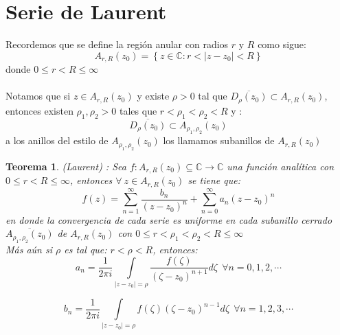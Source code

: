 \documentclass[spanish, openright,oneside]{book}
\newtheorem{teo}{Teorema}[chapter]
\theoremstyle{definition}
\begin{document}
\section*{Serie de Laurent \ \textbf{\textsf{\cite{marsd1996}}}  }
Recordemos que se define la región anular con radios $r$ y $R$ como sigue:
\[
A_{r,R}(z_0)=\left\{ z\in\mathbb{C} : r<|z-z_0|<R\right\}
\]
donde $0\leq r < R \leq \infty$\\
\\
Notamos que si $z \in A_{r,R}(z_0)$ y existe $\rho >0$ tal que $\overline{D_\rho(z_0)} \subset A_{r,R}(z_0) $, entonces existen $\rho_1, \rho_2 >0$ tales que $r < \rho_1 < \rho_2 < R$ y : \[\overline{D_\rho(z_0)} \subset A_{\rho_1,\rho_2}(z_0)\] a los anillos del estilo de $ A_{\rho_1,\rho_2}(z_0) $ los llamamos subanillos de $A_{r,R}(z_0)$

\begin{teo}\label{teolaurent} { (Laurent) :}
Sea $f:A_{r,R}(z_0) \subseteq\mathbb{C}\rightarrow \mathbb{C}$ una función analítica con $0\leq r < R \leq \infty$, entonces $\forall \ z \in A_{r,R}(z_0) $ se tiene que:
\[
f(z)=\sum_{n=1}^\infty\frac{b_n}{(z-z_0)^n}+\sum_{n=0}^\infty a_n(z-z_0)^n
\]
en donde la convergencia de cada serie es uniforme en cada subanillo cerrado $\overline{A_{\rho_1, \rho_2}(z_0)}$ de $A_{r,R}(z_0)$ con $0\leq r < \rho_1 < \rho_2 < R \leq \infty$\\
Más aún si $\rho$ es tal que: $r<\rho<R$, entonces:
\[
a_n=\frac{1}{2\pi i} \int\limits_{|z-z_0|=\rho} \frac{f(\zeta)}{(\zeta-z_0)^{n+1}} d\zeta \ \ \forall n=0,1,2,\cdots 
\]

\[
b_n=\frac{1}{2\pi i} \int\limits_{|z-z_0|=\rho}f(\zeta)(\zeta-z_0)^{n-1} d\zeta \ \ \forall n=1,2,3,\cdots 
\]
\end{teo}
\end{document}

